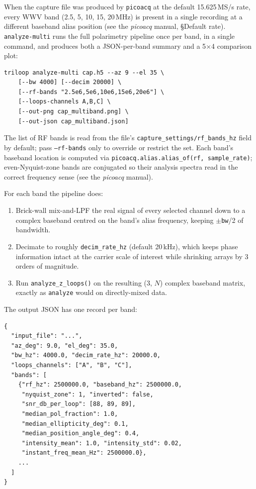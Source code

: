 \documentclass[11pt]{article}
\begin{document}
When the capture file was produced by \texttt{picoacq} at the default
15.625\,MS/s rate, every WWV band (2.5, 5, 10, 15, 20\,MHz) is present
in a single recording at a different baseband alias position
(see the \textit{picoacq} manual, \S Default rate).
\texttt{analyze-multi} runs the full polarimetry pipeline once per
band, in a single command, and produces both a JSON-per-band summary
and a 5$\times$4 comparison plot:

\begin{lstlisting}[style=shell]
triloop analyze-multi cap.h5 --az 9 --el 35 \
    [--bw 4000] [--decim 20000] \
    [--rf-bands "2.5e6,5e6,10e6,15e6,20e6"] \
    [--loops-channels A,B,C] \
    [--out-png cap_multiband.png] \
    [--out-json cap_multiband.json]
\end{lstlisting}

The list of RF bands is read from the file's
\texttt{capture\_settings/rf\_bands\_hz} field by default; pass
\texttt{--rf-bands} only to override or restrict the set.  Each band's
baseband location is computed via
\texttt{picoacq.alias.alias\_of(rf, sample\_rate)}; even-Nyquist-zone
bands are conjugated so their analysis spectra read in the correct
frequency sense (see the \textit{picoacq} manual).

For each band the pipeline does:
\begin{enumerate}\itemsep=2pt
\item Brick-wall mix-and-LPF the real signal of every selected channel
      down to a complex baseband centred on the band's alias frequency,
      keeping $\pm$\texttt{bw}/2 of bandwidth.
\item Decimate to roughly \texttt{decim\_rate\_hz} (default 20\,kHz),
      which keeps phase information intact at the carrier scale of
      interest while shrinking arrays by 3 orders of magnitude.
\item Run \texttt{analyze\_z\_loops()} on the resulting (3, $N$)
      complex baseband matrix, exactly as
      \texttt{analyze} would on directly-mixed data.
\end{enumerate}

The output JSON has one record per band:

\begin{lstlisting}[style=py]
{
  "input_file": "...",
  "az_deg": 9.0, "el_deg": 35.0,
  "bw_hz": 4000.0, "decim_rate_hz": 20000.0,
  "loops_channels": ["A", "B", "C"],
  "bands": [
    {"rf_hz": 2500000.0, "baseband_hz": 2500000.0,
     "nyquist_zone": 1, "inverted": false,
     "snr_db_per_loop": [88, 89, 89],
     "median_pol_fraction": 1.0,
     "median_ellipticity_deg": 0.1,
     "median_position_angle_deg": 0.4,
     "intensity_mean": 1.0, "intensity_std": 0.02,
     "instant_freq_mean_Hz": 2500000.0},
    ...
  ]
}
\end{lstlisting}
\end{document}
